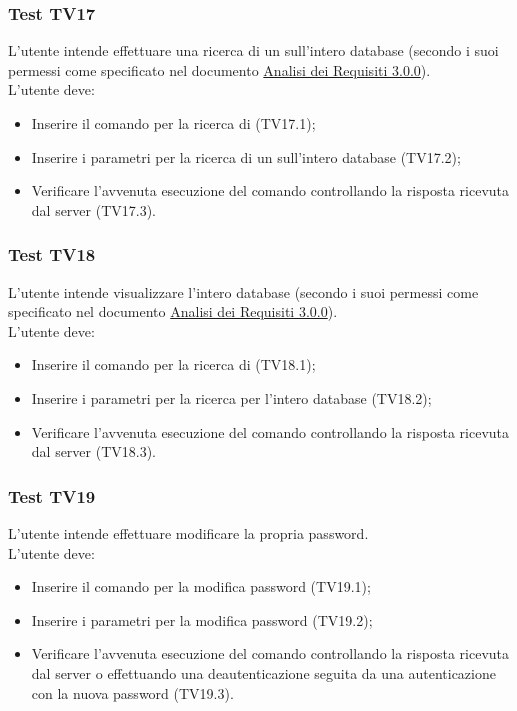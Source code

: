 \documentclass{scalatekids-article}
\begin{document}
\subsubsection{Test TV17}

L'utente intende effettuare una ricerca di un  sull'intero database (secondo i suoi permessi come specificato nel documento \href{run:../Esterni/AnalisiDeiRequisiti\_v3.0.0.pdf}{Analisi dei Requisiti 3.0.0}).\\
L'utente deve:
\begin{itemize}
\item Inserire il comando per la ricerca di  (TV17.1);
\item Inserire i parametri per la ricerca di un  sull'intero database (TV17.2);
\item Verificare l'avvenuta esecuzione del comando controllando la risposta ricevuta dal server (TV17.3).
\end{itemize}

\subsubsection{Test TV18}

L'utente intende visualizzare l'intero database (secondo i suoi permessi come specificato nel documento \href{run:../Esterni/AnalisiDeiRequisiti\_v3.0.0.pdf}{Analisi dei Requisiti 3.0.0}).\\
L'utente deve:
\begin{itemize}
\item Inserire il comando per la ricerca di  (TV18.1);
\item Inserire i parametri per la ricerca per l'intero database (TV18.2);
\item Verificare l'avvenuta esecuzione del comando controllando la risposta ricevuta dal server (TV18.3).
\end{itemize}

\subsubsection{Test TV19}

L'utente intende effettuare modificare la propria password.\\
L'utente deve:
\begin{itemize}
\item Inserire il comando per la modifica password (TV19.1);
\item Inserire i parametri per la modifica password (TV19.2);
\item Verificare l'avvenuta esecuzione del comando controllando la risposta ricevuta dal server o effettuando una deautenticazione seguita da una autenticazione con la nuova password (TV19.3).
\end{itemize}
\end{document}
